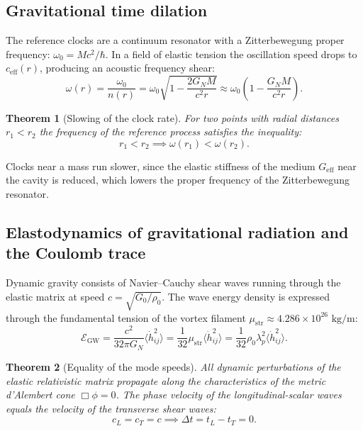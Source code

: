 \documentclass[11pt,a4paper]{article}
\newtheorem{theorem}{Theorem}
\theoremstyle{definition}
\theoremstyle{remark}
\begin{document}
\subsection{Gravitational time dilation}

The reference clocks are a continuum resonator with a Zitterbewegung proper frequency: $\omega_0 = M c^2 / \hbar$. In a field of elastic tension the oscillation speed drops to $c_{\mathrm{eff}}(r)$, producing an acoustic frequency shear:
\begin{equation}
	\omega(r) = \frac{\omega_0}{n(r)} = \omega_0 \sqrt{1 - \frac{2 G_N M}{c^2 r}} \approx \omega_0 \left( 1 - \frac{G_N M}{c^2 r} \right).
	\label{eq:clock_redshift_exact}
\end{equation}

\begin{theorem}[Slowing of the clock rate]
	\label{thm:gravitational_time_dilation}
	For two points with radial distances $r_1 < r_2$ the frequency of the reference process satisfies the inequality:
	\begin{equation}
		r_1 < r_2 \implies \omega(r_1) < \omega(r_2).
		\label{eq:redshift_monotonicity}
	\end{equation}
\end{theorem}
Clocks near a mass run slower, since the elastic stiffness of the medium $G_{\mathrm{eff}}$ near the cavity is reduced, which lowers the proper frequency of the Zitterbewegung resonator.

\subsection{Elastodynamics of gravitational radiation and the Coulomb trace}

Dynamic gravity consists of Navier--Cauchy shear waves running through the elastic matrix at speed $c = \sqrt{G_0 / \rho_0}$. The wave energy density is expressed through the fundamental tension of the vortex filament $\mu_{\mathrm{str}} \approx 4.286 \times 10^{26}\text{ kg/m}$:
\begin{equation}
	\mathcal{E}_{\mathrm{GW}} = \frac{c^2}{32\pi G_N} \langle \dot{h}_{ij}^2 \rangle = \frac{1}{32} \mu_{\mathrm{str}} \langle \dot{h}_{ij}^2 \rangle = \frac{1}{32} \rho_0 \lambda_p^2 \langle \dot{h}_{ij}^2 \rangle.
	\label{eq:gw_energy_density_formula}
\end{equation}

\begin{theorem}[Equality of the mode speeds]
	\label{thm:gw_speed_equality}
	All dynamic perturbations of the elastic relativistic matrix propagate along the characteristics of the metric d'Alembert cone $\Box \phi = 0$. The phase velocity of the longitudinal-scalar waves equals the velocity of the transverse shear waves:
	\begin{equation}
		c_L = c_T = c \implies \Delta t = t_L - t_T = 0.
		\label{eq:wave_speeds_equal}
	\end{equation}
\end{theorem}
\end{document}

